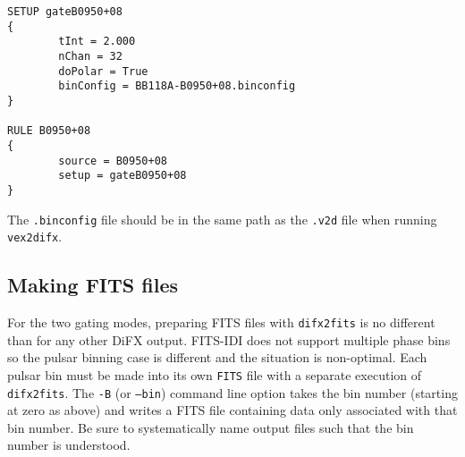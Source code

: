 \begin{verbatim}
SETUP gateB0950+08
{
        tInt = 2.000
        nChan = 32
        doPolar = True
        binConfig = BB118A-B0950+08.binconfig
}

RULE B0950+08
{
        source = B0950+08
        setup = gateB0950+08
}
\end{verbatim}

The {\tt .binconfig} file should be in the same path as the {\tt .v2d} file when running {\tt vex2difx}.

\subsection{Making FITS files}

For the two gating modes, preparing FITS files with {\tt difx2fits} is no different than for any other DiFX output.
FITS-IDI does not support multiple phase bins so the pulsar binning case is different and the situation is non-optimal.
Each pulsar bin must be made into its own {\tt FITS} file with a separate execution of {\tt difx2fits}.  
The {\tt -B} (or {\tt --bin}) command line option takes the bin number (starting at zero as above) and writes a FITS file containing data only associated with that bin number.
Be sure to systematically name output files such that the bin number is understood.
